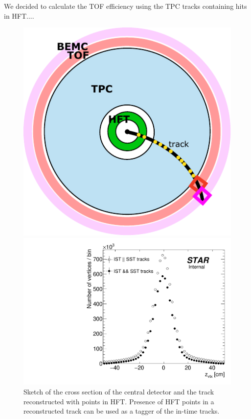 We decided to calculate the TOF efficiency using the TPC tracks containing hits in HFT.... %
\begin{figure}[h]%
\centering%
\begin{minipage}{.4725\textwidth}%
  \centering%
  \includegraphics[width=0.965\linewidth]{graphics/systematicsEfficiency/TofSyst/effSketch.pdf}%
  \caption[Sketch of the track with points in HFT.]%
  {Sketch of the cross section of the central detector and the track reconstructed with points in HFT. Presence of HFT points in a reconstructed track can be used as a tagger of the in-time tracks.}
  \label{fig:hftEffSketch}
\end{minipage}%
\quad\quad%
\begin{minipage}{.4725\textwidth}%
  \centering%
  \includegraphics[width=\linewidth]{graphics/systematicsEfficiency/TofSyst/zVtxHFT.pdf}%

\end{minipage}
\end{figure}

